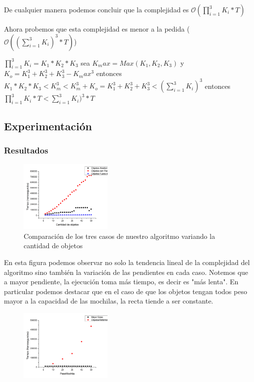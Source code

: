 \documentclass[spanish,12pt]{article}
\begin{document}
De cualquier manera podemos concluir que la complejidad es $\mathcal{O}(\prod_{i=1}^{3}K_{i} * T)$

Ahora probemos que esta complejidad es menor a la pedida ($\mathcal{O}((\sum_{i=1}^{3}K_{i})^{3} * T)$)

$\prod_{i=1}^{3}K_{i}  = K_1*K_2*K_3$   sea $K_max = Max(K_1,K_2,K_3)$ y $K_o= K_1^3 + K_2^3 + K_3^3 - K_max^3$ entonces $K_1*K_2*K_3 < K_m^3 < K_m^3 + K_o = K_1^3+K_2^3+K_3^3 <(\sum_{i=1}^{3}K_{i})^{3}$ entonces $\prod_{i=1}^{3}K_{i}* T < \sum_{i=1}^{3}K_{i})^{3} * T $


\subsection{Experimentación}

\subsubsection{Resultados}

\begin{figure}[H]
\centering
\includegraphics[width=0.4\textwidth]{comparacionObjetos}
\caption{Comparación de los tres casos de nuestro algoritmo variando la cantidad de objetos}
\end{figure}

En esta figura podemos observar no solo la tendencia lineal de la complejidad del algoritmo sino también la variación de las pendientes en cada caso. Notemos que a mayor pendiente, la ejecución toma más tiempo, es decir	 es "más lenta".
En particular podemos destacar que en el caso de que los objetos tengan todos peso mayor a la capacidad de las mochilas, la recta tiende a ser constante. 
  
\begin{figure}[H]
\centering
\includegraphics[width=0.4\textwidth]{pesoMCvsObjAl}
\caption{}
\end{figure}
\end{document}
